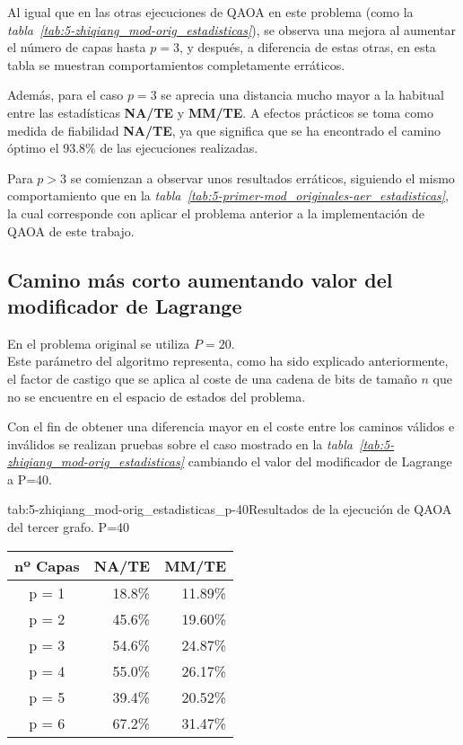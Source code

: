 Al igual que en las otras ejecuciones de QAOA en este problema (como la \textit{tabla~\ref{tab:5-zhiqiang_mod-orig_estadisticas}}), se observa una mejora al aumentar el número de capas hasta $p = 3$, y después, a diferencia de estas otras, en esta tabla se muestran comportamientos completamente erráticos.

Además, para el caso $p = 3$ se aprecia una distancia mucho mayor a la habitual entre las estadísticas \textbf{NA/TE} y \textbf{MM/TE}.
A efectos prácticos se toma como medida de fiabilidad \textbf{NA/TE}, ya que significa que se ha encontrado el camino óptimo el 93.8\% de las ejecuciones realizadas.

Para $p > 3$ se comienzan a observar unos resultados erráticos, siguiendo el mismo comportamiento que en la \textit{tabla~\ref{tab:5-primer-mod_originales-aer_estadisticas}}, la cual corresponde con aplicar el problema anterior a la implementación de QAOA de este trabajo.

\subsection{Camino más corto aumentando valor del modificador de Lagrange}

En el problema original se utiliza $P=20$.
\\
Este parámetro del algoritmo representa, como ha sido explicado anteriormente, el factor de castigo que se aplica al coste de una cadena de bits de tamaño $n$ que no se encuentre en el espacio de estados del problema.

Con el fin de obtener una diferencia mayor en el coste entre los caminos válidos e inválidos se realizan pruebas sobre el caso mostrado en la \textit{tabla~\ref{tab:5-zhiqiang_mod-orig_estadisticas}} cambiando el valor del modificador de Lagrange a P=40.

\begin{table}[Resultados QAOA {--} artículo de Fan \textit{et al.} (2023) {--} $P = 40$]{tab:5-zhiqiang_mod-orig_estadisticas_p-40}{Resultados de la ejecución de QAOA del tercer grafo. P=40}
  \centering
  \begin{tabular}{|c|r|r|}
    \hline
    \textbf{nº Capas} & \textbf{NA/TE} & \textbf{MM/TE} \\ \hline
    p = 1 & 18.8\% & 11.89\% \\ \hline
    p = 2 & 45.6\% & 19.60\% \\ \hline
    p = 3 & 54.6\% & 24.87\% \\ \hline
    p = 4 & 55.0\% & 26.17\% \\ \hline
    p = 5 & 39.4\% & 20.52\% \\ \hline
    p = 6 & 67.2\% & 31.47\% \\ \hline
  \end{tabular}
\end{table}


